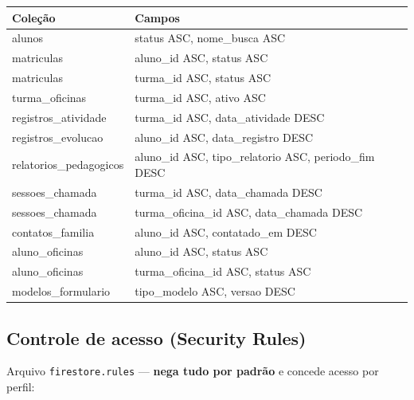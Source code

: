 \documentclass[a4paper,11pt]{article}
\begin{document}
\begin{center}
\begin{tabularx}{\textwidth}{l X}
\toprule
\textbf{Coleção} & \textbf{Campos} \\
\midrule
alunos & status ASC, nome\_busca ASC \\
matriculas & aluno\_id ASC, status ASC \\
matriculas & turma\_id ASC, status ASC \\
turma\_oficinas & turma\_id ASC, ativo ASC \\
registros\_atividade & turma\_id ASC, data\_atividade DESC \\
registros\_evolucao & aluno\_id ASC, data\_registro DESC \\
relatorios\_pedagogicos & aluno\_id ASC, tipo\_relatorio ASC, periodo\_fim DESC \\
sessoes\_chamada & turma\_id ASC, data\_chamada DESC \\
sessoes\_chamada & turma\_oficina\_id ASC, data\_chamada DESC \\
contatos\_familia & aluno\_id ASC, contatado\_em DESC \\
aluno\_oficinas & aluno\_id ASC, status ASC \\
aluno\_oficinas & turma\_oficina\_id ASC, status ASC \\
modelos\_formulario & tipo\_modelo ASC, versao DESC \\
\bottomrule
\end{tabularx}
\end{center}

\subsection{Controle de acesso (Security Rules)}

Arquivo \texttt{firestore.rules} --- \textbf{nega tudo por padrão} e concede acesso por perfil:
\end{document}
